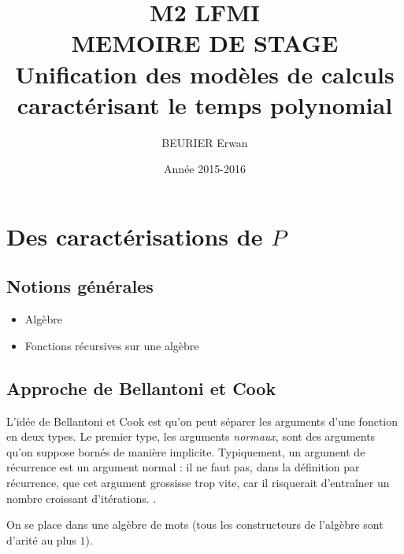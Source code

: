 \documentclass{article}
\author{BEURIER Erwan}
\title{M2 LFMI \\ MEMOIRE DE STAGE \\ Unification des modèles de calculs caractérisant le temps polynomial}
\date{Année 2015-2016}
\begin{document}
	\maketitle
	
	\tableofcontents
	
	\pagebreak
	
	\section{Des caractérisations de $P$}
	
		\subsection{Notions générales}
		
		\begin{itemize}
			\item 	Algèbre
			\item 	Fonctions récursives sur une algèbre
		\end{itemize}
		
		
		\subsection{Approche de Bellantoni et Cook}
		
		
		L'idée de Bellantoni et Cook est qu'on peut séparer les arguments d'une fonction en deux types. Le premier type, les arguments \emph{normaux}, sont des arguments qu'on suppose bornés de manière implicite. Typiquement, un argument de récurrence est un argument normal : il ne faut pas, dans la définition par récurrence, que cet argument grossisse trop vite, car il risquerait d'entraîner un nombre croissant d'itérations. .
		
		On se place dans une algèbre de mots (tous les constructeurs de l'algèbre sont d'arité au plus $1$).
		
\end{document}

